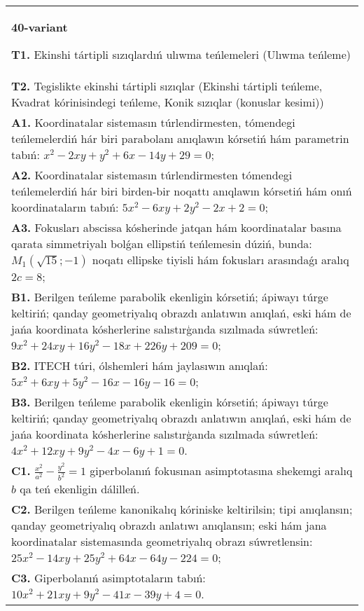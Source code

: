 \documentclass{article}
\begin{document}
\begin{tabular}{m{17cm}}
\textbf{40-variant}
\newline

\textbf{T1.} Ekinshi tártipli sızıqlardıń ulıwma teńlemeleri (Ulıwma teńleme) \\
\textbf{T2.} Tegislikte ekinshi tártipli sızıqlar (Ekinshi tártipli teńleme, Kvadrat kórinisindegi teńleme, Konik sızıqlar (konuslar kesimi)) \\
\textbf{A1.} Koordinatalar sistemasın túrlendirmesten, tómendegi teńlemelerdiń hár biri parabolanı anıqlawın kórsetiń hám parametrin tabıń: $x^2-2 x y+y^2+6 x-14 y+29=0$; \\
\textbf{A2.} Koordinatalar sistemasın túrlendirmesten tómendegi teńlemelerdiń hár biri birden-bir noqattı anıqlawın kórsetiń hám onıń koordinataların tabıń: $5 x^2-6 x y+2 y^2-2 x+2=0$; \\
\textbf{A3.} Fokusları abscissa kósherinde jatqan hám koordinatalar basına qarata simmetriyalı bolǵan ellipstiń teńlemesin dúziń, bunda: $M_1 (\sqrt{15};-1) $ noqatı ellipske tiyisli hám fokusları arasındaǵı aralıq $2 c=8$; \\
\textbf{B1.} Berilgen teńleme parabolik ekenligin kórsetiń; ápiwayı túrge keltiriń; qanday geometriyalıq obrazdı anlatıwın anıqlań, eski hám de jańa koordinata kósherlerine salıstırģanda sızılmada súwretleń: $9 x^2+24 x y+16 y^2-18 x+226 y+209=0$; \\
\textbf{B2.} ITECH túri, ólshemleri hám jaylasıwın anıqlań: $5 x^2+6 x y+5 y^2-16 x-16 y-16=0$; \\
\textbf{B3.} Berilgen teńleme parabolik ekenligin kórsetiń; ápiwayı túrge keltiriń; qanday geometriyalıq obrazdı anlatıwın anıqlań, eski hám de jańa koordinata kósherlerine salıstırģanda sızılmada súwretleń:$4 x^2+12 x y+9 y^2-4 x-6 y+1=0$. \\
\textbf{C1.} $\frac{x^2}{a^2}-\frac{y^2}{b^2}=1$ giperbolanıń fokusınan asimptotasına shekemgi aralıq $b$ qa teń ekenligin dálilleń. \\
\textbf{C2.} Berilgen teńleme kanonikalıq kóriniske keltirilsin; tipi anıqlansın; qanday geometriyalıq obrazdı anlatıwı anıqlansın; eski hám jana koordinatalar sistemasında geometriyalıq obrazı súwretlensin: $25 x^2-14 x y+25 y^2+64 x-64 y-224=0$; \\
\textbf{C3.} Giperbolanıń asimptotaların tabıń: $10 x^2+21 x y+9 y^2-41 x-39 y+4=0$. \\

\end{tabular}
\vspace{1cm}
\end{document}
